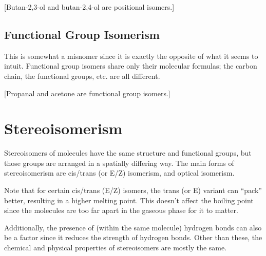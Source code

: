 			\diagram[1.0]{
				\chemfig{!\molMeR-[:-30](-[:270]!\molOH)-[:30](-[:90]!\molOH)-[:-30]-[:30]!\molMe}\hspace{10mm}
				\chemfig{!\molMeR-[:-30](-[:270]!\molOH)-[:30]-[:-30](-[:270]!\molOH)-[:30]!\molMe}
			}[Butan-2,3-ol and butan-2,4-ol are positional isomers.]



		\subsection{Functional Group Isomerism}
			This is somewhat a misnomer since it is exactly the opposite of what it seems to intuit. Functional group isomers
			share only their molecular formulas; the carbon chain, the functional groups, etc. are all different.

			\diagram[1.0]{

				\chemfig{!\molO=^[:90]-[:150]-[:210]!\molMeR}			\hspace{10mm}
				\chemfig{!\molMeR-[:30](=[:90]!\molO)-[:-30]!\molMe}
			}[Propanal and acetone are functional group isomers.]




	\section{Stereoisomerism}

		Stereoisomers of molecules have the same structure and functional groups, but those groups are arranged in a spatially
		differing way. The main forms of stereoisomerism are cis/trans (or E/Z) isomerism, and optical isomerism.

		Note that for certain cis/trans (E/Z) isomers, the trans (or E) variant can \enquote{pack} better, resulting in a higher melting
		point. This doesn't affect the boiling point since the molecules are too far apart in the gaseous phase for it to matter.

		Additionally, the presence of  (within the same molecule) hydrogen bonds can also be a factor since
		it reduces the strength of  hydrogen bonds. Other than these, the chemical and physical properties of
		stereoisomers are mostly the same.


		\pagebreak
